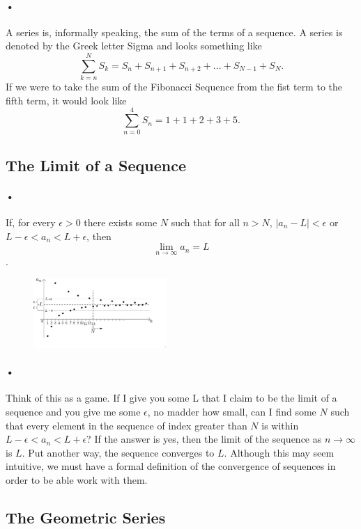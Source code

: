 \documentclass[font =22]{report}
\begin{document}
\paragraph{•}
A series is, informally speaking, the sum of the terms of a sequence. A series is denoted by the Greek letter Sigma and looks something like 
\[
\sum_{k = n}^{N} S_k = S_n + S_{n+1}+S_{n+2}+...+S_{N-1}+ S_N.
\]
If we were to take the sum of the Fibonacci Sequence from the fist term to the fifth term, it would look like
\[
\sum_{n = 0}^{4} S_n = 1+1+2+3+5. 
\]

\subsection*{The Limit of a Sequence}

\paragraph{•}
If, for every $\epsilon > 0$ there exists some $N$ such that for all $n>N$, $ |a_n - L|<\epsilon$ or $L-\epsilon<a_n<L+\epsilon$, then $$\lim_{n \to \infty} a_n = L$$.
\begin{figure}[H]
\includegraphics[width=0.45\textwidth]{figures/limit}
\end{figure}

\paragraph{•}
Think of this as a game. If I give you some L that I claim to be the limit of a sequence and you give me some $\epsilon$, no madder how small, can I find some $N$ such that every element in the sequence of index greater than $N$ is within  $L-\epsilon<a_n<L+\epsilon$? If the answer is yes, then the limit of the sequence as $n \to \infty$ is $L$. Put another way, the sequence converges to $L$. Although this may seem intuitive, we must have a formal definition of the convergence of sequences in order to be able work with them.
\subsection*{The Geometric Series}
\end{document}
